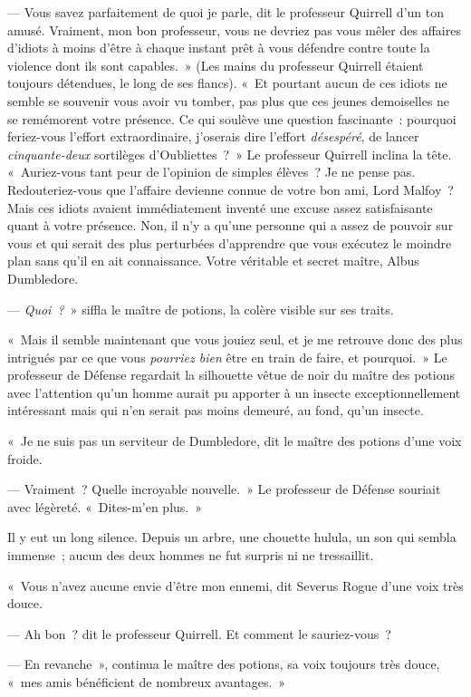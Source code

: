 --- Vous savez parfaitement de quoi je parle, dit le professeur Quirrell d'un ton amusé. Vraiment, mon bon professeur, vous ne devriez pas vous mêler des affaires d'idiots à moins d'être à chaque instant prêt à vous défendre contre toute la violence dont ils sont capables.~» (Les mains du professeur Quirrell étaient toujours détendues, le long de ses flancs). «~Et pourtant aucun de ces idiots ne semble se souvenir vous avoir vu tomber, pas plus que ces jeunes demoiselles ne se remémorent votre présence. Ce qui soulève une question fascinante~: pourquoi feriez-vous l'effort extraordinaire, j'oserais dire l'effort \emph{désespéré}, de lancer \emph{cinquante-deux} sortilèges d'Oubliettes~?~» Le professeur Quirrell inclina la tête. «~Auriez-vous tant peur de l'opinion de simples élèves~? Je ne pense pas. Redouteriez-vous que l'affaire devienne connue de votre bon ami, Lord Malfoy~? Mais ces idiots avaient immédiatement inventé une excuse assez satisfaisante quant à votre présence. Non, il n'y a qu'une personne qui a assez de pouvoir sur vous et qui serait des plus perturbées d'apprendre que vous exécutez le moindre plan sans qu'il en ait connaissance. Votre véritable et secret maître, Albus Dumbledore.

--- \emph{Quoi~?}~» siffla le maître de potions, la colère visible sur ses traits.

«~Mais il semble maintenant que vous jouiez seul, et je me retrouve donc des plus intrigués par ce que vous \emph{pourriez bien} être en train de faire, et pourquoi.~» Le professeur de Défense regardait la silhouette vêtue de noir du maître des potions avec l'attention qu'un homme aurait pu apporter à un insecte exceptionnellement intéressant mais qui n'en serait pas moins demeuré, au fond, qu'un insecte.

«~Je ne suis pas un serviteur de Dumbledore, dit le maître des potions d'une voix froide.

--- Vraiment~? Quelle incroyable nouvelle.~» Le professeur de Défense souriait avec légèreté. «~Dites-m'en plus.~»

Il y eut un long silence. Depuis un arbre, une chouette hulula, un son qui sembla immense~; aucun des deux hommes ne fut surpris ni ne tressaillit.

«~Vous n'avez aucune envie d'être mon ennemi, dit Severus Rogue d'une voix très douce.

--- Ah bon~? dit le professeur Quirrell. Et comment le sauriez-vous~?

--- En revanche~», continua le maître des potions, sa voix toujours très douce, «~mes amis bénéficient de nombreux avantages.~»

